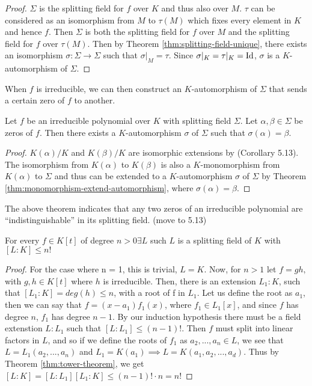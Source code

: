 \begin{proof}
	$\Sigma$ is the splitting field for $f$ over $K$ and thus also over $M$. $\tau$ can be considered as an isomorphism from $M$ to $\tau(M)$ which fixes every element in $K$ and hence $f$. Then $\Sigma$ is both the splitting field for $f$ over $M$ and the splitting field for $f$ over $\tau(M)$. Then by Theorem \ref{thm:splitting-field-unique}, there exists an isomorphism $\sigma: \Sigma \to \Sigma$ such that $\sigma | _M = \tau$. Since $\sigma | _K = \tau |_K = \operatorname{Id}$, $\sigma$ is a $K$-automorphism of $\Sigma$. 
\end{proof}

When $f$ is irreducible, we can then construct an $K$-automorphism of $\Sigma$ that sends a certain zero of $f$ to another.

\begin{theorem} \label{thm:automorphism-from-zeros}
	Let $f$ be an irreducible polynomial over $K$ with splitting field $\Sigma$. Let $\alpha, \beta \in \Sigma$ be zeros of $f$. Then there exists a $K$-automorphism $\sigma$ of $\Sigma$ such that $\sigma(\alpha) = \beta$. 
\end{theorem}

\begin{proof}
	$K(\alpha)/K$ and $K(\beta)/K$ are isomorphic extensions by \TODO(Corollary 5.13). The isomorphism from $K(\alpha)$ to $K(\beta)$ is also a $K$-monomorphism from $K(\alpha)$ to $\Sigma$ and thus can be extended to a $K$-automorphism $\sigma$ of $\Sigma$ by Theorem \ref{thm:monomorphism-extend-automorphism}, where $\sigma(\alpha) = \beta$.
\end{proof}

The above theorem indicates that any two zeros of an irreducible polynomial are ``indistinguishable'' in its splitting field. (\TODO move to 5.13)

\begin{theorem}\label{thm:upper-bound-splitting-field}
    For every $f \in K[t]$ of degree $n>0 \exists L$ such $L$ is a splitting field of $K$ with $[L:K]\leq n!$
\end{theorem}

\begin{proof}
    For the case where n = 1, this is trivial, $L=K$.
    Now, for $n>1$ let $f=gh,$ with $g,h \in K[t]$ where $h$ is irreducible. Then, there is an extension $L_1:K$, such that $[L_1:K]=deg(h)\leq n$, with a root of f in $L_1$. Let us define the root as $a_1$, then we can say that $f=(x-a_1)f_1(x)$, where $f_1\in L_1[x]$, and since $f$ has degree $n$, $f_1$ has degree $n-1$. By our induction hypothesis there must be a field extenstion $L:L_1$ such that $[L:L_1]\leq(n-1)!$. Then $f$ must split into linear factors in $L$, and so if we define the roots of $f_1$ as $a_2,...,a_n\in L$, we see that $L=L_1(a_2,...,a_n)$ and $L_1=K(a_1) \implies L=K(a_1,a_2,...,a_d)$. Thus by Theorem \ref{thm:tower-theorem}, we get $[L:K]=[L:L_1][L_1:K]\leq (n-1)!\cdot n = n!$
\end{proof}


